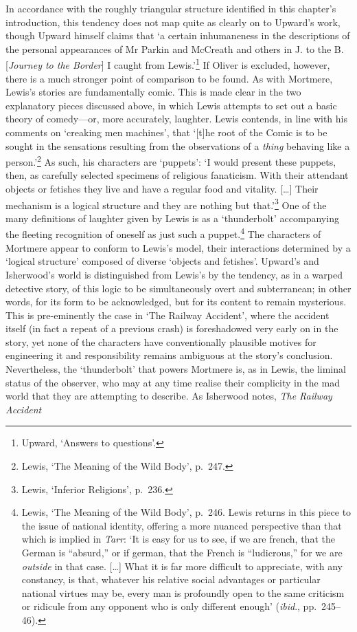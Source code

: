 \documentclass[]{article}
\begin{document}
In accordance with the roughly triangular structure identified in this
chapter’s introduction, this tendency does not map quite as clearly on
to Upward’s work, though Upward himself claims that ‘a certain
inhumaneness in the descriptions of the personal appearances of Mr
Parkin and McCreath and others in J. to the B. {[}\emph{Journey to the
Border}{]} I caught from Lewis.’\footnote{Upward, ‘Answers to
  questions’.} If Oliver is excluded, however, there is a much stronger
point of comparison to be found. As with Mortmere, Lewis’s stories are
fundamentally comic. This is made clear in the two explanatory pieces
discussed above, in which Lewis attempts to set out a basic theory of
comedy—or, more accurately, laughter. Lewis contends, in line with his
comments on ‘creaking men machines’, that ‘{[}t{]}he root of the Comic
is to be sought in the sensations resulting from the observations of a
\emph{thing} behaving like a person.’\footnote{Lewis, ‘The Meaning of
  the Wild Body’, p.~247.} As such, his characters are ‘puppets’: ‘I
would present these puppets, then, as carefully selected specimens of
religious fanaticism. With their attendant objects or fetishes they live
and have a regular food and vitality. {[}\ldots{}{]} Their mechanism is
a logical structure and they are nothing but that.’\footnote{Lewis,
  ‘Inferior Religions’, p.~236.} One of the many definitions of laughter
given by Lewis is as a ‘thunderbolt’ accompanying the fleeting
recognition of oneself as just such a puppet.\footnote{Lewis, ‘The
  Meaning of the Wild Body’, p.~246. Lewis returns in this piece to the
  issue of national identity, offering a more nuanced perspective than
  that which is implied in \emph{Tarr}: ‘It is easy for us to see, if we
  are french, that the German is “absurd,” or if german, that the French
  is “ludicrous,” for we are \emph{outside} in that case. {[}\ldots{}{]}
  What it is far more difficult to appreciate, with any constancy, is
  that, whatever his relative social advantages or particular national
  virtues may be, every man is profoundly open to the same criticism or
  ridicule from any opponent who is only different enough’
  (\emph{ibid}., pp.~245–46).} The characters of Mortmere appear to
conform to Lewis’s model, their interactions determined by a ‘logical
structure’ composed of diverse ‘objects and fetishes’. Upward’s and
Isherwood’s world is distinguished from Lewis’s by the tendency, as in a
warped detective story, of this logic to be simultaneously overt and
subterranean; in other words, for its form to be acknowledged, but for
its content to remain mysterious. This is pre-eminently the case in ‘The
Railway Accident’, where the accident itself (in fact a repeat of a
previous crash) is foreshadowed very early on in the story, yet none of
the characters have conventionally plausible motives for engineering it
and responsibility remains ambiguous at the story’s conclusion.
Nevertheless, the ‘thunderbolt’ that powers Mortmere is, as in Lewis,
the liminal status of the observer, who may at any time realise their
complicity in the mad world that they are attempting to describe. As
Isherwood notes, \emph{The Railway Accident}
\end{document}
